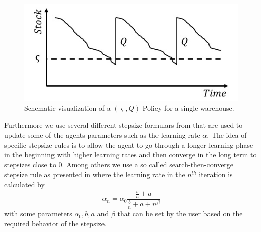 \documentclass[journal, a4paper]{IEEEtran}
\theoremstyle{plain}
\theoremstyle{definition}
\begin{document}
\begin{figure}[h]
	\centering
	\includegraphics[width=0.8\columnwidth]{sQ.jpg}
	\caption{\label{sQ} Schematic visualization of a $(\varsigma, Q)$-Policy for a single warehouse.}
\end{figure}
\newline
Furthermore we use several different stepsize formulars from \cite{PowellADP} that are used to update some of the agents parameters such as the learning rate $\alpha$. The idea of specific stepsize rules is to allow the agent to go through a longer learning phase in the beginning with higher learning rates and then converge in the long term to stepsizes close to $0$. %
Among others we use a so called search-then-converge stepsize rule as presented in \cite{PowellADP} where the learning rate in the $n^{th}$ iteration is calculated by
\begin{equation}
\label{eq:stc}
	\alpha_n = \alpha_0 \frac{\frac{b}{n} + a}{ \frac{b}{n} + a + n^{\beta}}
\end{equation}
with some parameters $\alpha_0, b, a$ and $\beta$ that can be set by the user based on the required behavior of the stepsize.
\end{document}
